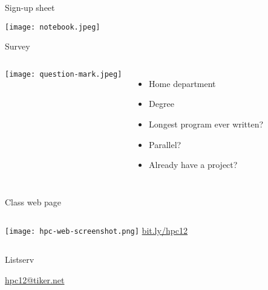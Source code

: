 \documentclass[english,compress]{beamer}
\begin{document}
\begin{frame}{Sign-up sheet}
  \begin{center}
    \texttt{[image: notebook.jpeg]}
  \end{center}
\end{frame}
\begin{frame}{Survey}
  \begin{columns}
    \texttt{[image: question-mark.jpeg]}
    \begin{itemize}[<+->]
      \item Home department
      \item Degree
      \item Longest program ever written?
      \item Parallel?
      \item Already have a project?
    \end{itemize}
  \end{columns}
\end{frame}
\begin{frame}{Class web page}
  \begin{columns}
      \texttt{[image: hpc-web-screenshot.png]}
      \Huge
      \href{http://bit.ly/hpc12}{bit.ly/hpc12}
  \end{columns}
\end{frame}
\begin{frame}{Listserv}
  \begin{center}
    \Huge
    \href{mailto:hpc12@tiker.net}{hpc12@tiker.net}
  \end{center}
\end{frame}
\end{document}

